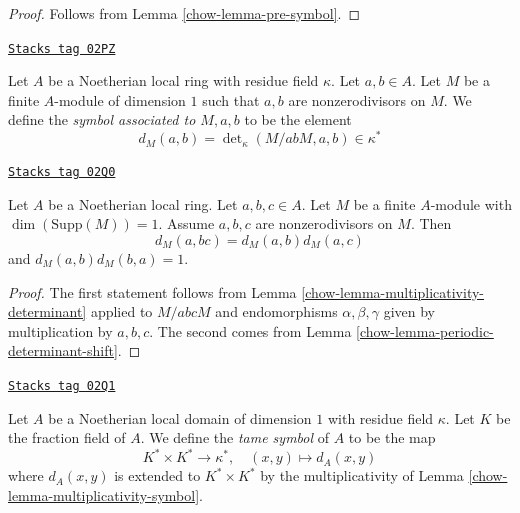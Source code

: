 \begin{proof}

Follows from Lemma \ref{chow-lemma-pre-symbol}.
\end{proof}

\begin{definition}[Symbol M]
\label{chow-definition-symbol-M}
\href{https://stacks.math.columbia.edu/tag/02PZ}{\texttt{Stacks tag 02PZ}}

Let $A$ be a Noetherian local ring with residue field $\kappa$.
Let $a, b \in A$.
Let $M$ be a finite $A$-module of dimension $1$
such that $a, b$ are nonzerodivisors on $M$.
We define the {\it symbol associated to $M, a, b$}
to be the element
$$
d_M(a, b) =
\det\nolimits_\kappa(M/abM, a, b) \in \kappa^*
$$
\end{definition}

\begin{lemma}
\label{chow-lemma-multiplicativity-symbol}
\href{https://stacks.math.columbia.edu/tag/02Q0}{\texttt{Stacks tag 02Q0}}

Let $A$ be a Noetherian local ring.
Let $a, b, c \in A$. Let $M$ be a finite $A$-module
with $\dim(\text{Supp}(M)) = 1$. Assume $a, b, c$ are nonzerodivisors on $M$.
Then
$$
d_M(a, bc) = d_M(a, b) d_M(a, c)
$$
and $d_M(a, b)d_M(b, a) = 1$.
\end{lemma}

\begin{proof}

The first statement follows from Lemma \ref{chow-lemma-multiplicativity-determinant}
applied to $M/abcM$ and endomorphisms $\alpha, \beta, \gamma$ given by
multiplication by $a, b, c$.
The second comes from Lemma \ref{chow-lemma-periodic-determinant-shift}.
\end{proof}

\begin{definition}
\label{chow-definition-tame-symbol}
\href{https://stacks.math.columbia.edu/tag/02Q1}{\texttt{Stacks tag 02Q1}}

Let $A$ be a Noetherian local domain of dimension $1$
with residue field $\kappa$.
Let $K$ be the fraction field of $A$.
We define the {\it tame symbol} of $A$ to be the map
$$
K^* \times K^* \longrightarrow \kappa^*,
\quad
(x, y) \longmapsto d_A(x, y)
$$
where $d_A(x, y)$ is extended to $K^* \times K^*$ by the multiplicativity of
Lemma \ref{chow-lemma-multiplicativity-symbol}.
\end{definition}

